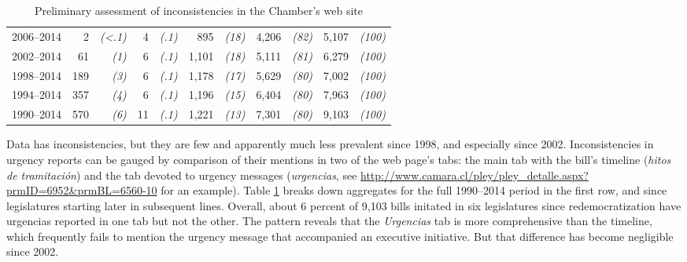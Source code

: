 \documentclass{article}
\begin{document}
\begin{table}
\begin{center}
\begin{tabular}{rrrrrrrrrrr}
2006--2014  &    2  &  \emph{(<.1)}  &   4  &  \emph{(.1)}  &    895  &  \emph{(18)}  &  4,206  &  \emph{(82)}  & 5,107  &  \emph{(100)} \\
2002--2014  &   61  &  \emph{(1)}    &   6  &  \emph{(.1)}  &  1,101  &  \emph{(18)}  &  5,111  &  \emph{(81)}  & 6,279  &  \emph{(100)} \\
1998--2014  &  189  &  \emph{(3)}    &   6  &  \emph{(.1)}  &  1,178  &  \emph{(17)}  &  5,629  &  \emph{(80)}  & 7,002  &  \emph{(100)} \\
1994--2014  &  357  &  \emph{(4)}    &   6  &  \emph{(.1)}  &  1,196  &  \emph{(15)}  &  6,404  &  \emph{(80)}  & 7,963  &  \emph{(100)} \\
1990--2014  &  570  &    \emph{(6)}  &  11  &  \emph{(.1)}  &  1,221  &  \emph{(13)}  &  7,301 &  \emph{(80)}  &  9,103  &  \emph{(100)} \\ \hline
\end{tabular}  
\caption{Preliminary assessment of inconsistencies in the Chamber's web site}\label{T:webInconsistencies}
\end{center}
\end{table}

Data has inconsistencies, but they are few and apparently much less prevalent since 1998, and especially since 2002. Inconsistencies in urgency reports can be gauged by comparison of their mentions in two of the web page's tabs: the main tab with the bill's timeline (\emph{hitos de tramitación}) and the tab devoted to urgency messages (\emph{urgencias}, see \url{http://www.camara.cl/pley/pley_detalle.aspx?prmID=6952&prmBL=6560-10} for an example). Table \ref{T:webInconsistencies} breaks down aggregates for the full 1990--2014 period in the first row, and since legislatures starting later in subsequent lines. Overall, about 6 percent of 9,103 bills initated in six legislatures since redemocratization have urgencias reported in one tab but not the other. The pattern reveals that the \emph{Urgencias} tab is more comprehensive than the timeline, which frequently fails to mention the urgency message that accompanied an executive initiative. But that difference has become negligible since 2002. 
\end{document}
